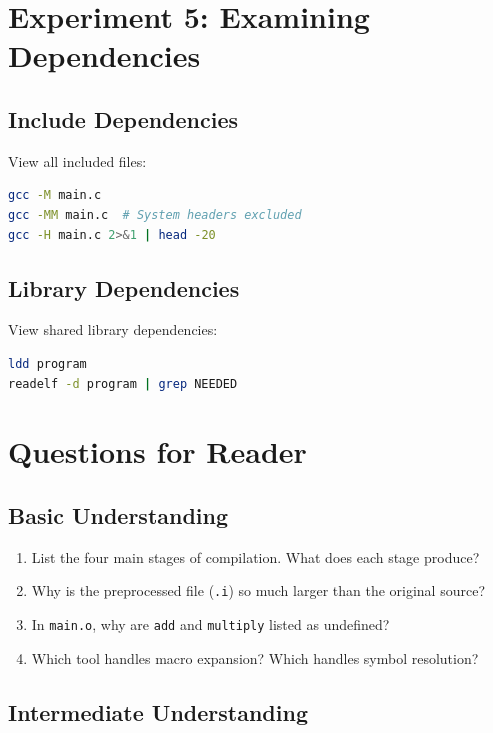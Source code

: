 \section{Experiment 5: Examining Dependencies}

\subsection{Include Dependencies}

View all included files:

\begin{lstlisting}[language=bash]
gcc -M main.c
gcc -MM main.c  # System headers excluded
gcc -H main.c 2>&1 | head -20
\end{lstlisting}

\subsection{Library Dependencies}

View shared library dependencies:

\begin{lstlisting}[language=bash]
ldd program
readelf -d program | grep NEEDED
\end{lstlisting}

\section{Questions for Reader}

\subsection{Basic Understanding}

\begin{enumerate}
\item List the four main stages of compilation. What does each stage produce?
\item Why is the preprocessed file (\texttt{.i}) so much larger than the original source?
\item In \texttt{main.o}, why are \texttt{add} and \texttt{multiply} listed as undefined?
\item Which tool handles macro expansion? Which handles symbol resolution?
\end{enumerate}

\subsection{Intermediate Understanding}

